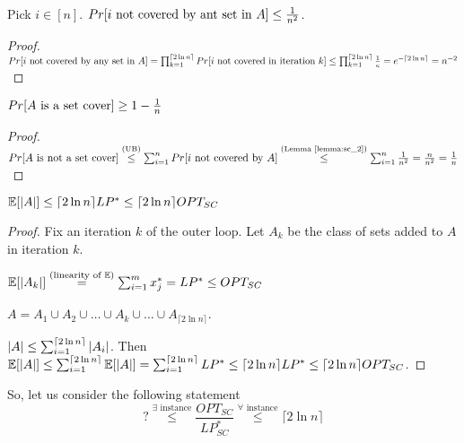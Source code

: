     \begin{lemma}\label{lemma:sc_2}
        Pick $i \in [n]$. $Pr[i \text{ not covered by ant set in } A] \leq \frac{1}{n^2}$.
    \end{lemma}

    \begin{proof}
        $Pr[i \text{ not covered by any set in } A] = \prod_{k=1}^{\lceil 2 \ln n \rceil} Pr[i \text{ not covered in iteration } k] \leq \prod_{k=1}^{\lceil 2 \ln n \rceil} \frac{1}{e} = e^{- \lceil 2 \ln n \rceil} = n^{-2} $ 
    \end{proof}

    \begin{lemma}
        $Pr[A \text{ is a set cover}] \geq 1 - \frac{1}{n}$
    \end{lemma}

    \begin{proof}
        $Pr[A \text{ is not a set cover}] \overset{\text{(UB)}}{\leq} \sum_{i=1}^n Pr[i \text{ not covered by } A] \overset{\text{(Lemma \ref{lemma:sc_2})}}{\leq} \sum_{i=1}^{n} \frac{1}{n^2} = \frac{n}{n^2} = \frac{1}{n}$
    \end{proof}

    \begin{lemma}
        $\mathbb{E}[\vert A \vert] \leq \lceil 2 \ln n \rceil LP^* \leq \lceil 2 \ln n \rceil OPT_{SC}$
    \end{lemma}

    \begin{proof}
        Fix an iteration $k$ of the outer loop. Let $A_k$ be the class of sets added to $A$ in iteration $k$.

        $\mathbb{E}[\vert A_k \vert] \overset{(\text{linearity of } \mathbb{E})}{=} \sum_{i=1}^{m} x_j^* = LP^* \leq OPT_{SC}$

        $A = A_1 \cup A_2 \cup \dots \cup A_k \cup \dots \cup A_{\lceil 2 \ln n \rceil}$.
        
        $\vert A \vert \leq \sum_{i = 1}^{\lceil 2 \ln n \rceil} \vert A_i \vert$. Then $\mathbb{E}[\vert A \vert] \leq \sum_{i=1}^{\lceil 2 \ln n \rceil} \mathbb{E}[\vert A \vert] = \sum_{i=1}^{\lceil 2 \ln n \rceil} LP^* \leq \lceil 2 \ln n \rceil LP^* \leq \lceil 2 \ln n \rceil OPT_{SC}$.
    \end{proof}

    So, let us consider the following statement
    \[ ? \overset{\exists \text{ instance}}{\leq} \frac{OPT_{SC}}{LP_{SC}^*} \overset{\forall \text{ instance}}{\leq} \lceil 2 \ln n \rceil \]

